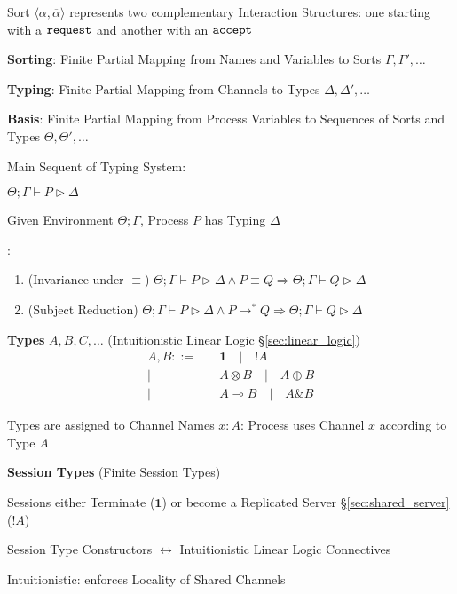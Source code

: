 Sort $\langle \alpha, \overline{\alpha} \rangle$ represents two
complementary Interaction Structures: one starting with a
$\mathtt{request}$ and another with an $\mathtt{accept}$


\textbf{Sorting}: Finite Partial Mapping from Names and Variables to
Sorts $\Gamma, \Gamma', \ldots$

\textbf{Typing}: Finite Partial Mapping from Channels to Types
$\Delta, \Delta', \ldots$

\textbf{Basis}: Finite Partial Mapping from Process Variables to
Sequences of Sorts and Types $\Theta, \Theta', \ldots$



Main Sequent of Typing System:

$\Theta; \Gamma \vdash P \rhd \Delta$

Given Environment $\Theta; \Gamma$, Process $P$ has Typing $\Delta$

\cite{honda-vasconcelos-kubo98}:
\begin{enumerate}
  \item (Invariance under $\equiv$)
    $\Theta; \Gamma \vdash P \rhd \Delta \wedge P \equiv Q
    \Rightarrow \Theta; \Gamma \vdash Q \rhd \Delta$
  \item (Subject Reduction)
    $\Theta; \Gamma \vdash P \rhd \Delta \wedge P \rightarrow^* Q
    \Rightarrow \Theta; \Gamma \vdash Q \rhd \Delta$
\end{enumerate}


\textbf{Types} $A, B, C, \ldots$ (Intuitionistic Linear Logic
\S\ref{sec:linear_logic})
\cite{caires-pfenning10}
\[
\begin{split}
  A,B ::=&\quad \mathbf{1} \quad
        | \quad !A\\
        |&\quad A \otimes B \quad
        | \quad A \oplus B \\
        |&\quad A \multimap B \quad
        | \quad A \& B
\end{split}
\]

Types are assigned to Channel Names $x:A$: Process uses Channel $x$
according to Type $A$


\textbf{Session Types}
(Finite Session Types)
\cite{caires-pfenning10}

Sessions either Terminate ($\mathbf{1}$) or become a Replicated Server
\S\ref{sec:shared_server} ($!A$)

Session Type Constructors $\leftrightarrow$ Intuitionistic Linear
Logic Connectives

Intuitionistic: enforces Locality of Shared Channels

